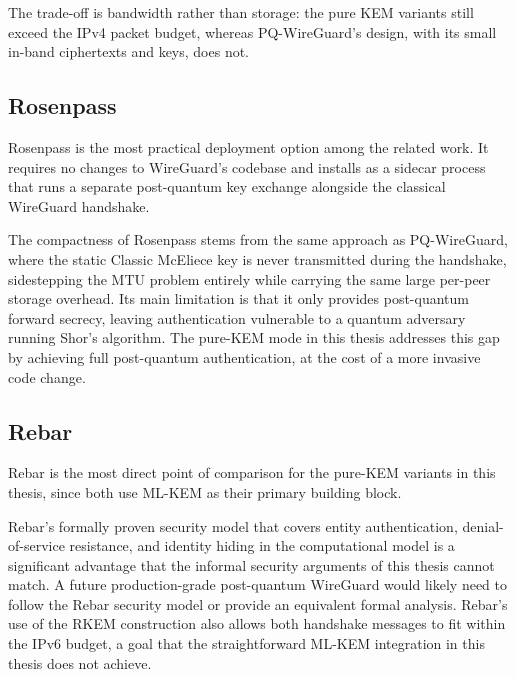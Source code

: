 The trade-off is bandwidth rather than storage: the pure KEM variants still exceed the IPv4 packet budget, whereas PQ-WireGuard's design, with its small in-band ciphertexts and keys, does not.

\subsection{Rosenpass}
Rosenpass \cite{rosenpass} is the most practical deployment option among the related work. It requires no changes to WireGuard's codebase and installs as a sidecar process that runs a separate post-quantum key exchange alongside the classical WireGuard handshake.

The compactness of Rosenpass stems from the same approach as PQ-WireGuard, where the static Classic McEliece key is never transmitted during the handshake, sidestepping the MTU problem entirely while carrying the same large per-peer storage overhead. Its main limitation is that it only provides post-quantum forward secrecy, leaving authentication vulnerable to a quantum adversary running Shor's algorithm. The pure-KEM mode in this thesis addresses this gap by achieving full post-quantum authentication, at the cost of a more invasive code change.

\subsection{Rebar}
Rebar \cite{rebar} is the most direct point of comparison for the pure-KEM variants in this thesis, since both use ML-KEM as their primary building block.

Rebar's formally proven security model that covers entity authentication, denial-of-service resistance, and identity hiding in the computational model is a significant advantage that the informal security arguments of this thesis cannot match. A future production-grade post-quantum WireGuard would likely need to follow the Rebar security model or provide an equivalent formal analysis. Rebar's use of the RKEM construction also allows both handshake messages to fit within the IPv6 budget, a goal that the straightforward ML-KEM integration in this thesis does not achieve.


